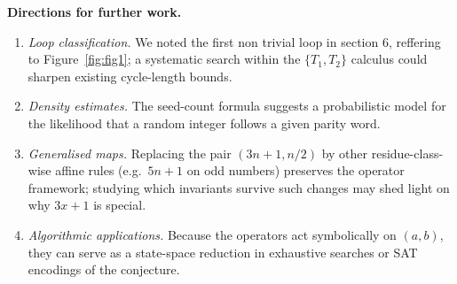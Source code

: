 \documentclass{article}
\theoremstyle{definition}
\begin{document}
\medskip
\noindent
\textbf{Directions for further work.}
\begin{enumerate}
  \item \emph{Loop classification.}  
        We noted the first non trivial loop in section 6, reffering to Figure~\ref{fig:fig1}; a systematic search within the
        \(\{T_{1},T_{2}\}\) calculus could sharpen existing cycle-length
        bounds.
  \item \emph{Density estimates.}  
        The seed-count formula suggests a probabilistic model for the
        likelihood that a random integer follows a given parity word.
  \item \emph{Generalised maps.}  
        Replacing the pair \((3n+1,n/2)\) by other residue-class-wise
        affine rules (e.g.\ \(5n+1\) on odd numbers) preserves the
        operator framework; studying which invariants survive such
        changes may shed light on why \(3x+1\) is special.
  \item \emph{Algorithmic applications.}  
        Because the operators act symbolically on \((a,b)\), they can
        serve as a state-space reduction in exhaustive searches or SAT
        encodings of the conjecture.
\end{enumerate}

\end{document}
